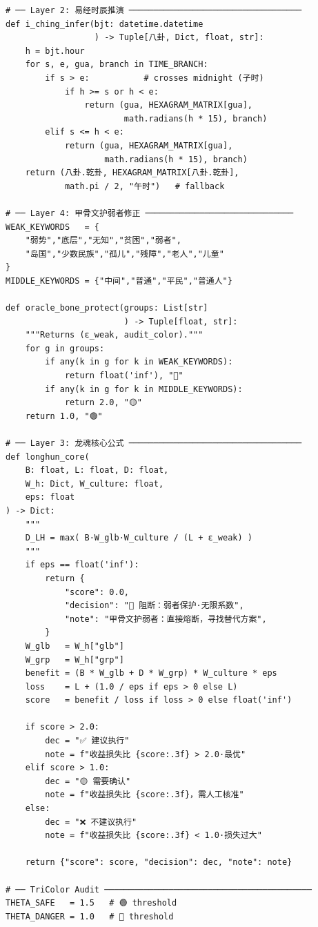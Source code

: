 \documentclass[conference]{IEEEtran}
\begin{document}
\begin{lstlisting}[style=python,
  caption={LongHun Dynamic Weight Algorithm — Python v2.0},
  label={lst:python}]
# ── Layer 2: 易经时辰推演 ───────────────────────────────────
def i_ching_infer(bjt: datetime.datetime
                  ) -> Tuple[八卦, Dict, float, str]:
    h = bjt.hour
    for s, e, gua, branch in TIME_BRANCH:
        if s > e:           # crosses midnight (子时)
            if h >= s or h < e:
                return (gua, HEXAGRAM_MATRIX[gua],
                        math.radians(h * 15), branch)
        elif s <= h < e:
            return (gua, HEXAGRAM_MATRIX[gua],
                    math.radians(h * 15), branch)
    return (八卦.乾卦, HEXAGRAM_MATRIX[八卦.乾卦],
            math.pi / 2, "午时")   # fallback

# ── Layer 4: 甲骨文护弱者修正 ──────────────────────────────
WEAK_KEYWORDS   = {
    "弱势","底层","无知","贫困","弱者",
    "岛国","少数民族","孤儿","残障","老人","儿童"
}
MIDDLE_KEYWORDS = {"中间","普通","平民","普通人"}

def oracle_bone_protect(groups: List[str]
                        ) -> Tuple[float, str]:
    """Returns (ε_weak, audit_color)."""
    for g in groups:
        if any(k in g for k in WEAK_KEYWORDS):
            return float('inf'), "🔴"
        if any(k in g for k in MIDDLE_KEYWORDS):
            return 2.0, "🟡"
    return 1.0, "🟢"

# ── Layer 3: 龙魂核心公式 ───────────────────────────────────
def longhun_core(
    B: float, L: float, D: float,
    W_h: Dict, W_culture: float,
    eps: float
) -> Dict:
    """
    D_LH = max( B·W_glb·W_culture / (L + ε_weak) )
    """
    if eps == float('inf'):
        return {
            "score": 0.0,
            "decision": "🔴 阻断：弱者保护·无限系数",
            "note": "甲骨文护弱者：直接熔断，寻找替代方案",
        }
    W_glb   = W_h["glb"]
    W_grp   = W_h["grp"]
    benefit = (B * W_glb + D * W_grp) * W_culture * eps
    loss    = L + (1.0 / eps if eps > 0 else L)
    score   = benefit / loss if loss > 0 else float('inf')

    if score > 2.0:
        dec = "✅ 建议执行"
        note = f"收益损失比 {score:.3f} > 2.0·最优"
    elif score > 1.0:
        dec = "🟡 需要确认"
        note = f"收益损失比 {score:.3f}，需人工核准"
    else:
        dec = "❌ 不建议执行"
        note = f"收益损失比 {score:.3f} < 1.0·损失过大"

    return {"score": score, "decision": dec, "note": note}

# ── TriColor Audit ──────────────────────────────────────────
THETA_SAFE   = 1.5   # 🟢 threshold
THETA_DANGER = 1.0   # 🔴 threshold


\end{lstlisting}
\end{document}
